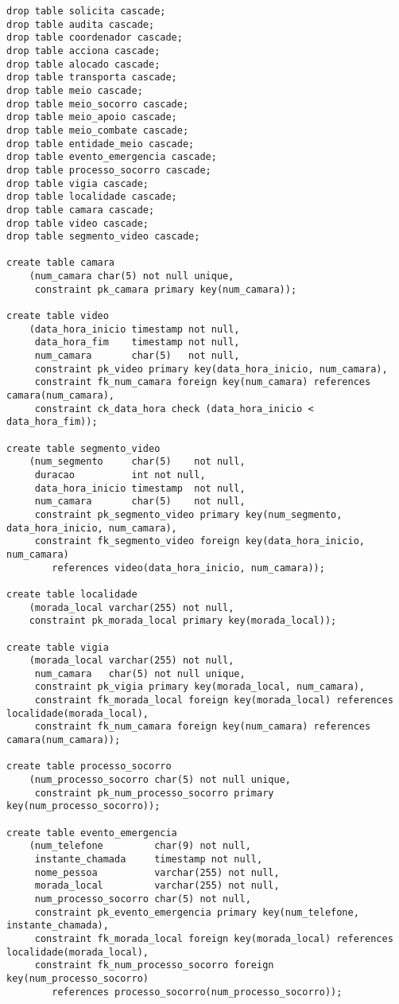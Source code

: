 \documentclass[10pt,a4paper]{article}
\begin{document}
\begin{verbatim}
drop table solicita cascade;
drop table audita cascade;
drop table coordenador cascade;
drop table acciona cascade;
drop table alocado cascade;
drop table transporta cascade;
drop table meio cascade;
drop table meio_socorro cascade;
drop table meio_apoio cascade;
drop table meio_combate cascade;
drop table entidade_meio cascade;
drop table evento_emergencia cascade;
drop table processo_socorro cascade;
drop table vigia cascade;
drop table localidade cascade;
drop table camara cascade;
drop table video cascade;
drop table segmento_video cascade;

create table camara 
    (num_camara char(5) not null unique,
     constraint pk_camara primary key(num_camara));

create table video
    (data_hora_inicio timestamp not null,
     data_hora_fim    timestamp not null,
     num_camara       char(5)   not null,
     constraint pk_video primary key(data_hora_inicio, num_camara),
     constraint fk_num_camara foreign key(num_camara) references camara(num_camara),
     constraint ck_data_hora check (data_hora_inicio < data_hora_fim));

create table segmento_video
    (num_segmento     char(5)    not null,
     duracao          int not null,
     data_hora_inicio timestamp  not null,
     num_camara       char(5)    not null,
     constraint pk_segmento_video primary key(num_segmento, data_hora_inicio, num_camara),
     constraint fk_segmento_video foreign key(data_hora_inicio, num_camara) 
        references video(data_hora_inicio, num_camara));

create table localidade
    (morada_local varchar(255) not null,
    constraint pk_morada_local primary key(morada_local));

create table vigia
    (morada_local varchar(255) not null,
     num_camara   char(5) not null unique,
     constraint pk_vigia primary key(morada_local, num_camara),
     constraint fk_morada_local foreign key(morada_local) references localidade(morada_local),
     constraint fk_num_camara foreign key(num_camara) references camara(num_camara));

create table processo_socorro
    (num_processo_socorro char(5) not null unique,
     constraint pk_num_processo_socorro primary key(num_processo_socorro));

create table evento_emergencia
    (num_telefone         char(9) not null,
     instante_chamada     timestamp not null,
     nome_pessoa          varchar(255) not null,
     morada_local         varchar(255) not null,
     num_processo_socorro char(5) not null,
     constraint pk_evento_emergencia primary key(num_telefone, instante_chamada),
     constraint fk_morada_local foreign key(morada_local) references localidade(morada_local),
     constraint fk_num_processo_socorro foreign key(num_processo_socorro) 
        references processo_socorro(num_processo_socorro));


\end{verbatim}
\end{document}
